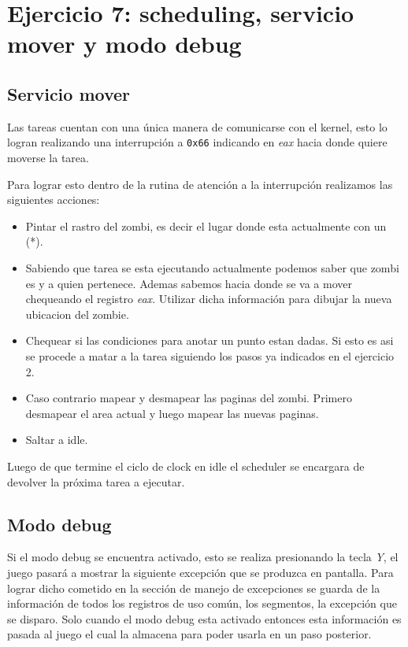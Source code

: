 \section{Ejercicio 7: scheduling, servicio mover y modo debug}


	\subsection{Servicio mover}
	Las tareas cuentan con una única manera de comunicarse con el kernel, esto lo logran realizando una interrupción a \texttt{0x66} indicando en \textit{eax} hacia donde quiere moverse la tarea.

	Para lograr esto dentro de la rutina de atención a la interrupción realizamos las siguientes acciones:

	\begin{itemize}
		\item{Pintar el rastro del zombi, es decir el lugar donde esta actualmente con un (*).}
		\item{Sabiendo que tarea se esta ejecutando actualmente podemos saber que zombi es y a quien pertenece. Ademas sabemos hacia donde se va a mover chequeando el registro \textit{eax}. Utilizar dicha información para dibujar la nueva ubicacion del zombie.}
		\item{Chequear si las condiciones para anotar un punto estan dadas. Si esto es asi se procede a matar a la tarea siguiendo los pasos ya indicados en el ejercicio 2.}
		\item{Caso contrario mapear y desmapear las paginas del zombi. Primero desmapear el area actual y luego mapear las nuevas paginas.}
		\item{Saltar a idle.}
	\end{itemize}

	Luego de que termine el ciclo de clock en idle el scheduler se encargara de devolver la próxima tarea a ejecutar.

	\subsection{Modo debug}
	Si el modo debug se encuentra activado, esto se realiza presionando la tecla \textit{Y}, el juego pasará a mostrar la siguiente excepción que se produzca en pantalla. Para lograr dicho cometido en la sección de manejo de excepciones se guarda de la información de todos los registros de uso común, los segmentos, la excepción que se disparo. Solo cuando el modo debug esta activado entonces esta información es pasada al juego el cual la almacena para poder usarla en un paso posterior.

